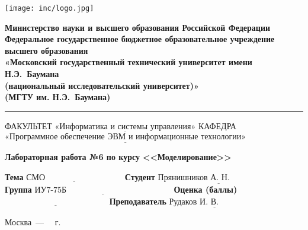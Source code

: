 \begin{titlepage}
	\fontsize{12pt}{12pt}\selectfont
	\noindent \begin{minipage}{0.15\textwidth}
		\texttt{[image: inc/logo.jpg]}
	\end{minipage}
	\noindent\begin{minipage}{0.9\textwidth}\centering
		\textbf{Министерство науки и высшего образования Российской Федерации}\\
		\textbf{Федеральное государственное бюджетное образовательное учреждение высшего образования}\\
		\textbf{«Московский государственный технический университет имени Н.Э.~Баумана}\\
		\textbf{(национальный исследовательский университет)»}\\
		\textbf{(МГТУ им. Н.Э.~Баумана)}
	\end{minipage}
	
	\fontsize{14pt]}{14pt}\selectfont
	\noindent\rule{18cm}{3pt}
	\newline\newline
	\noindent ФАКУЛЬТЕТ $\underline{\text{«Информатика и системы управления»}}$ \newline\newline
	\noindent КАФЕДРА $\underline{\text{«Программное обеспечение ЭВМ и информационные технологии»}}$\newline\newline\newline\newline\newline\newline\newline
	
	\begin{center}
		\Large\textbf{Лабораторная работа №6 по курсу}
		\Large\textbf{\hspace*{60pt}<<Моделирование>>}\newline\newline\newline
	\end{center}
	
	\noindent\textbf{Тема} $\underline{\text{СМО~~~~~~~~~~~~~~~~~~~~~~~~~~~~}}$\newline\newline
	\noindent\textbf{Студент} $\underline{\text{Прянишников А. Н.~~~~~~~~~~~~~~~~~~}}$\newline\newline
	\noindent\textbf{Группа} $\underline{\text{ИУ7-75Б~~~~~~~~~~~~~~~~~~~~~~~~~~~~~~~~~~~~~~}}$\newline\newline
	\noindent\textbf{Оценка (баллы)} $\underline{\text{~~~~~~~~~~~~~~~~~~~~~~~~~~~~~~~~~~~~~}}$\newline\newline
	\noindent\textbf{Преподаватель} $\underline{\text{Рудаков~И.~В.~~~~~~~~~~~~~~~}}$\newline
	
	\begin{center}
		\vfill
		Москва~---~\the\year
		~г.
	\end{center}
	\restoregeometry
\end{titlepage}